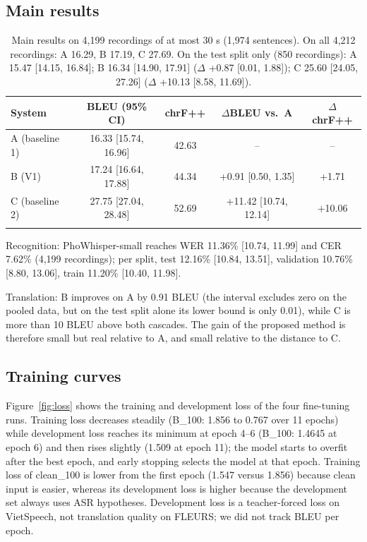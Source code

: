 \documentclass[pdflatex,sn-mathphys-num]{sn-jnl}
\newcommand{\ci}[2]{[#1, #2]}   %
\begin{document}
\subsection{Main results}

\begin{table}[t]
\caption{Main results on 4,199 recordings of at most 30 s (1,974 sentences). On all 4,212 recordings: A 16.29, B 17.19, C 27.69. On the test split only (850 recordings): A 15.47 \ci{14.15}{16.84}; B 16.34 \ci{14.90}{17.91} ($\Delta$ +0.87 \ci{0.01}{1.88}); C 25.60 \ci{24.05}{27.26} ($\Delta$ +10.13 \ci{8.58}{11.69}).}\label{tab:main}
\begin{tabular}{@{}lcccc@{}}
\toprule
System & BLEU (95\% CI) & chrF++ & $\Delta$BLEU vs.\ A & $\Delta$chrF++\\
\midrule
A (baseline 1) & 16.33 \ci{15.74}{16.96} & 42.63 & -- & --\\
B (V1) & 17.24 \ci{16.64}{17.88} & 44.34 & +0.91 \ci{0.50}{1.35} & +1.71\\
C (baseline 2) & 27.75 \ci{27.04}{28.48} & 52.69 & +11.42 \ci{10.74}{12.14} & +10.06\\
\botrule
\end{tabular}
\end{table}

Recognition: PhoWhisper-small reaches WER 11.36\% \ci{10.74}{11.99} and CER 7.62\% (4,199 recordings); per split, test 12.16\% \ci{10.84}{13.51}, validation 10.76\% \ci{8.80}{13.06}, train 11.20\% \ci{10.40}{11.98}.

Translation: B improves on A by 0.91 BLEU (the interval excludes zero on the pooled data, but on the test split alone its lower bound is only 0.01), while C is more than 10 BLEU above both cascades. The gain of the proposed method is therefore small but real relative to A, and small relative to the distance to C.

\subsection{Training curves}

Figure~\ref{fig:loss} shows the training and development loss of the four fine-tuning runs. Training loss decreases steadily (B\_100: 1.856 to 0.767 over 11 epochs) while development loss reaches its minimum at epoch 4--6 (B\_100: 1.4645 at epoch 6) and then rises slightly (1.509 at epoch 11); the model starts to overfit after the best epoch, and early stopping selects the model at that epoch. Training loss of clean\_100 is lower from the first epoch (1.547 versus 1.856) because clean input is easier, whereas its development loss is higher because the development set always uses ASR hypotheses. Development loss is a teacher-forced loss on VietSpeech, not translation quality on FLEURS; we did not track BLEU per epoch.
\end{document}

